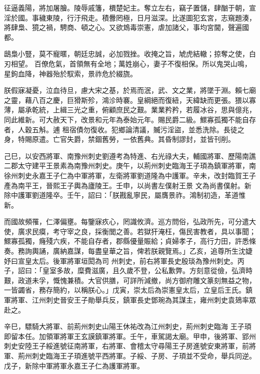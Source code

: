 \begin{pinyinscope}
 征逼義陽，將加屠膾。陵辱戚籓，檟楚妃主。奪立左右，竊子置儲，肆酗于朝，宣淫於國。事穢東陵，行汙飛走。積釁罔極，日月滋深。比遂圖犯玄宮，志窺題湊，將肆梟、獍之禍，騁商、頓之心。又欲鴆毒崇憲，虐加諸父，事均宮閫，聲遍國都。



 鴟梟小豎，莫不寵暱，朝廷忠誠，必加戮挫。收掩之旨，虓虎結轍；掠奪之使，白刃相望。
 百僚危氣，首領無有全地；萬姓崩心，妻子不復相保。所以鬼哭山鳴，星鉤血降，神器殆於馭索，景祚危於綴旒。



 朕假寐凝憂，泣血待旦，慮大宋之基，於焉而泯，武、文之業，將墜于淵。賴七廟之靈，藉八百之慶，巨猾斯殄，鴻沴時褰。皇綱絕而復紐，天緯缺而更張。猥以寡薄，屬承乾統，上緝三光之重，俯顧庶民之艱。業業矜矜，若履冰谷，思與億兆，同此維新。可大赦天下，改景和元年為泰始元年。賜民爵二級。鰥寡孤獨不能自存者，人穀五斛。逋
 租宿債勿復收。犯鄉論清議，贓污淫盜，並悉洗除。長徒之身，特賜原遣。亡官失爵，禁錮舊勞，一依舊典。其昏制謬封，並皆刊削。



 己巳，以安西將軍、南豫州刺史劉遵考為特進、右光祿大夫，輔國將軍、歷陽南譙二郡太守建平王景素為南豫州刺史。庚午，以荊州刺史臨海王子頊為鎮軍將軍，南徐州刺史永嘉王子仁為中軍將軍，左衛將軍劉道隆為中護軍。辛未，改封臨賀王子產為南平王，晉熙王子輿為廬陵王。壬申，以尚書左僕射王景
 文為尚書僕射。新除中護軍劉道隆卒。壬午，詔曰：「朕戡亂寧民，屬膺景祚。鴻制初造，革道惟新。



 而國故頻罹，仁澤偏壅。每鑒寐疚心，罔識攸濟。巡方問俗，弘政所先，可分遣大使，廣求民瘼，考守宰之良，採衡閭之善。若獄犴淹枉，傷民害教者，具以事聞；鰥寡孤獨，癃殘六疾，不能自存者，郡縣優量賑給；貞婦孝子，高行力田，許悉條奏。務詢輿誦，廣納嘉謀，每盡皇華之旨，俾若朕親覽焉。」乙亥，追尊所生沈婕妤曰宣皇太后。後軍將軍垣閎為司
 州刺史，前右將軍長史殷琰為豫州刺史。丙子，詔曰：「皇室多故，糜費滋廣，且久歲不登，公私歉弊。方刻意從儉，弘濟時艱，政道未孚，慨愧兼積。大官供膳，可詳所減撤，尚方御府雕文篆刻無益之物，一皆蠲省，務存簡約，以稱朕心。」戊寅，崇太后為崇憲皇太后，立皇后王氏。鎮軍將軍、江州刺史晉安王子勛舉兵反，鎮軍長史鄧琬為其謀主，雍州刺史袁鳷率眾赴之。



 辛巳，驃騎大將軍、前荊州刺史山陽王休祐改為江州刺史，荊州刺史臨海
 王子頊即留本任。加領軍將軍王玄謨鎮軍將軍。壬午，車駕謁太廟。甲申，後將軍、郢州刺史安陸王子綏進號征南將軍，右將軍、會稽太守尋陽王子房進號安東將軍，前將軍、荊州刺史臨海王子頊進號平西將軍。子綏、子房、子頊並不受命，舉兵同逆。戊子，新除中軍將軍永嘉王子仁為護軍將軍。




\end{pinyinscope}
